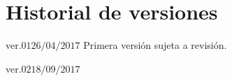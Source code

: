 \chapter{Historial de versiones}
ver.$01 26/04/2017$ Primera versión sujeta a revisión.
\\
\par
ver.$02 18/09/2017$ 
